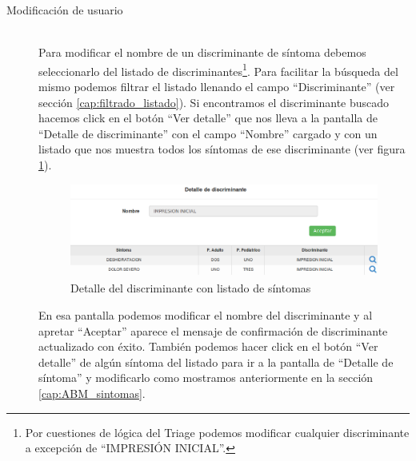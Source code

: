 \begin{description}
\item[Modificación de usuario] \mbox{} \\
Para modificar el nombre de un discriminante de síntoma debemos seleccionarlo del listado de discriminantes\footnote{Por cuestiones de lógica del Triage podemos modificar cualquier discriminante a excepción de ``IMPRESIÓN INICIAL''.}. Para facilitar la búsqueda del mismo podemos filtrar el listado llenando el campo ``Discriminante'' (ver sección \ref{cap:filtrado_listado}). Si encontramos el discriminante buscado hacemos click en el botón ``Ver detalle'' que nos lleva a la pantalla de ``Detalle de discriminante'' con el campo ``Nombre'' cargado y con un listado que nos muestra todos los síntomas de ese discriminante (ver figura \ref{fig:detalle_discriminante}).
\begin{figure}
\centerline{\includegraphics[width=1\textwidth]{listado_sintomas_de_discriminante.png}}
\caption{Detalle del discriminante con listado de síntomas}
\label{fig:detalle_discriminante}
\end{figure}
En esa pantalla podemos modificar el nombre del discriminante y al apretar ``Aceptar'' aparece el mensaje de confirmación de discriminante actualizado con éxito. También podemos hacer click en el botón ``Ver detalle'' de algún síntoma del listado para ir a la pantalla de ``Detalle de síntoma'' y modificarlo como mostramos anteriormente en la sección \ref{cap:ABM_sintomas}.

\end{description}